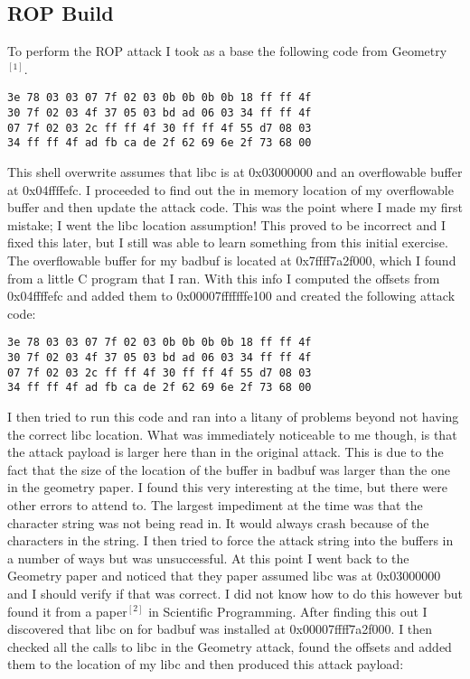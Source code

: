 \documentclass[11pt]{amsart}
\begin{document}
\subsection*{ROP Build}
To perform the ROP attack I took as a base the following code from Geometry$^{[1]}$.
\begin{verbatim}
3e 78 03 03 07 7f 02 03 0b 0b 0b 0b 18 ff ff 4f 
30 7f 02 03 4f 37 05 03 bd ad 06 03 34 ff ff 4f 
07 7f 02 03 2c ff ff 4f 30 ff ff 4f 55 d7 08 03
34 ff ff 4f ad fb ca de 2f 62 69 6e 2f 73 68 00 
\end{verbatim}
This shell overwrite assumes that libc is at 0x03000000 and an overflowable buffer at 0x04ffffefc. I proceeded to find out the in memory location of my overflowable buffer and then update the attack code. This was the point where I made my first mistake; I went the libc location assumption! This proved to be incorrect and I fixed this later, but I still was able to learn something from this initial exercise. The overflowable buffer for my badbuf is located at 0x7ffff7a2f000, which I found from a little C program that I ran. With this info I computed the offsets from 0x04ffffefc and added them to 0x00007fffffffe100 and created the following attack code:
\begin{verbatim}
3e 78 03 03 07 7f 02 03 0b 0b 0b 0b 18 ff ff 4f 
30 7f 02 03 4f 37 05 03 bd ad 06 03 34 ff ff 4f 
07 7f 02 03 2c ff ff 4f 30 ff ff 4f 55 d7 08 03
34 ff ff 4f ad fb ca de 2f 62 69 6e 2f 73 68 00 
\end{verbatim}
I then tried to run this code and ran into a litany of problems beyond not having the correct libc location. What was immediately noticeable to me though, is that the attack payload is larger here than in the original attack. This is due to the fact that the size of the location of the buffer in badbuf was larger than the one in the geometry paper. I found this very interesting at the time, but there were other errors to attend to. The largest impediment at the time was that the character string was not being read in. It would always crash because of the characters in the string. I then tried to force the attack string into the buffers in a number of ways but was unsuccessful.
At this point I went back to the Geometry paper and noticed that they paper assumed libc was at 0x03000000 and I should verify if that was correct. I did not know how to do this however but found it from a paper$^{[2]}$ in Scientific Programming. After finding this out I discovered that libc on for badbuf was installed at 0x00007ffff7a2f000. I then checked all the calls to libc in the Geometry attack, found the offsets and added them to the location of my libc and then produced this attack payload:
\end{document}
